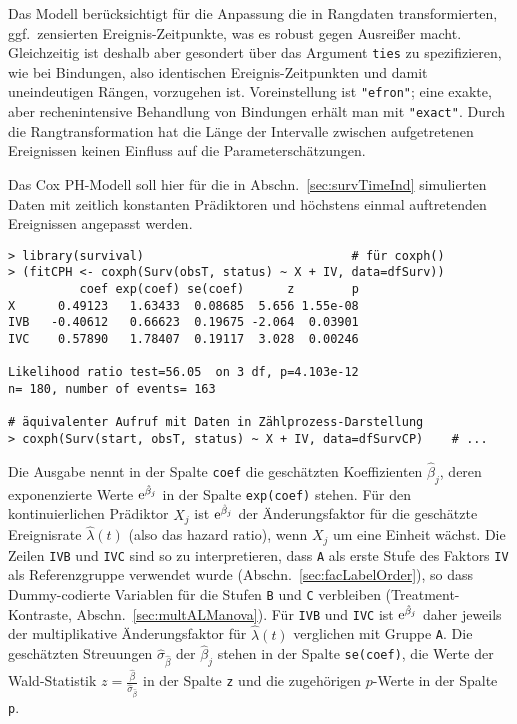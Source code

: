 Das Modell berücksichtigt für die Anpassung die in Rangdaten transformierten, ggf.\ zensierten Ereignis-Zeitpunkte, was es robust gegen Ausreißer macht. Gleichzeitig ist deshalb aber gesondert über das Argument \lstinline!ties! zu spezifizieren, wie bei Bindungen, also identischen Ereignis-Zeitpunkten und damit uneindeutigen Rängen, vorzugehen ist. Voreinstellung ist \lstinline!"efron"!; eine exakte, aber rechenintensive Behandlung von Bindungen erhält man mit \lstinline!"exact"!. Durch die Rangtransformation hat die Länge der Intervalle zwischen aufgetretenen Ereignissen keinen Einfluss auf die Parameterschätzungen.

\label{sec:survCPHres}
Das Cox PH-Modell soll hier für die in Abschn.\ \ref{sec:survTimeInd} simulierten Daten mit zeitlich konstanten Prädiktoren und höchstens einmal auftretenden Ereignissen angepasst werden.
\begin{lstlisting}
> library(survival)                             # für coxph()
> (fitCPH <- coxph(Surv(obsT, status) ~ X + IV, data=dfSurv))
          coef exp(coef) se(coef)      z        p
X      0.49123   1.63433  0.08685  5.656 1.55e-08
IVB   -0.40612   0.66623  0.19675 -2.064  0.03901
IVC    0.57890   1.78407  0.19117  3.028  0.00246

Likelihood ratio test=56.05  on 3 df, p=4.103e-12
n= 180, number of events= 163

# äquivalenter Aufruf mit Daten in Zählprozess-Darstellung
> coxph(Surv(start, obsT, status) ~ X + IV, data=dfSurvCP)    # ...
\end{lstlisting}

Die Ausgabe nennt in der Spalte \lstinline!coef! die geschätzten Koeffizienten $\hat{\beta}_{j}$, deren exponenzierte Werte ${\mathrm{e}}^{\hat{\beta}_{j}}$ in der Spalte \lstinline!exp(coef)! stehen. Für den kontinuierlichen Prädiktor $X_{j}$ ist ${\mathrm{e}}^{\hat{\beta}_{j}}$ der Änderungsfaktor für die geschätzte Ereignisrate $\hat{\lambda}(t)$ (also das hazard ratio), wenn $X_{j}$ um eine Einheit wächst. Die Zeilen \lstinline!IVB! und \lstinline!IVC! sind so zu interpretieren, dass \lstinline!A! als erste Stufe des Faktors \lstinline!IV! als Referenzgruppe verwendet wurde (Abschn.\ \ref{sec:facLabelOrder}), so dass Dummy-codierte Variablen für die Stufen \lstinline!B! und \lstinline!C! verbleiben (Treatment-Kontraste, Abschn.\ \ref{sec:multALManova}). Für \lstinline!IVB! und \lstinline!IVC! ist ${\mathrm{e}}^{\hat{\beta}_{j}}$ daher jeweils der multiplikative Änderungsfaktor für $\hat{\lambda}(t)$ verglichen mit Gruppe \lstinline!A!. Die geschätzten Streuungen $\hat{\sigma}_{\hat{\beta}}$ der $\hat{\beta}_{j}$ stehen in der Spalte \lstinline!se(coef)!, die Werte der Wald-Statistik $z = \frac{\hat{\beta}}{\hat{\sigma}_{\hat{\beta}}}$ in der Spalte \lstinline!z! und die zugehörigen $p$-Werte in der Spalte \lstinline!p!.

